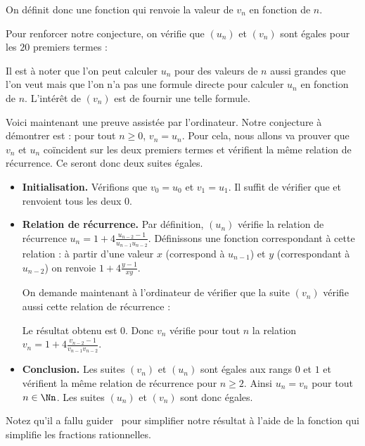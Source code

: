 \documentclass[class=report,crop=false]{standalone}
\begin{document}
On définit donc une fonction qui renvoie la valeur de $v_n$ en fonction de $n$.


Pour renforcer notre conjecture, on vérifie que $(u_n)$ et $(v_n)$ sont égales pour les $20$ premiers termes :


Il est à noter que l'on peut calculer $u_n$ pour des valeurs de $n$ aussi grandes que l'on veut mais que l'on n'a pas une formule
directe pour calculer $u_n$ en fonction de $n$. L'intérêt de $(v_n)$ est de fournir une 
telle formule.

\bigskip

Voici maintenant une preuve assistée par l'ordinateur.
Notre conjecture à démontrer est : pour tout $n \ge 0$, $v_n=u_n$.
Pour cela, nous allons va prouver que $v_n$ et $u_n$ coïncident sur les deux premiers termes et vérifient
la même relation de récurrence. Ce seront donc deux suites égales.

\begin{itemize}
  \item \textbf{Initialisation.} Vérifions que $v_0=u_0$ et $v_1=u_1$.
  Il suffit de vérifier que 
  et  renvoient tous les deux $0$.
  
  \item \textbf{Relation de récurrence.}
  Par définition, $(u_n)$ vérifie la relation de récurrence 
  $u_n = 1 + 4\frac{u_{n-2}-1}{u_{n-1}u_{n-2}}$.
  Définissons une fonction correspondant à cette relation : 
  à partir d'une valeur $x$ (correspond à $u_{n-1}$) et $y$ (correspondant à $u_{n-2}$)
  on renvoie $1 + 4\frac{y-1}{xy}$.
  
  
  On demande maintenant à l'ordinateur de vérifier que la suite $(v_n)$ vérifie aussi 
  cette relation de récurrence :
  
  Le résultat obtenu est $0$. Donc $v_n$ vérifie pour tout $n$ 
  la relation $v_n = 1 + 4\frac{v_{n-2}-1}{v_{n-1}v_{n-2}}$.
  
  \item \textbf{Conclusion.} Les suites $(v_n)$ et $(u_n)$ sont égales aux rangs $0$ et $1$ 
  et vérifient la même relation de récurrence pour $n\ge2$. Ainsi $u_n=v_n$ pour tout $n\in \Nn$.
  Les suites $(u_n)$ et $(v_n)$ sont donc égales.
  
\end{itemize}
Notez qu'il a fallu guider \Sage\ pour simplifier notre résultat à l'aide de la fonction
 qui simplifie les fractions rationnelles.
\end{document}
